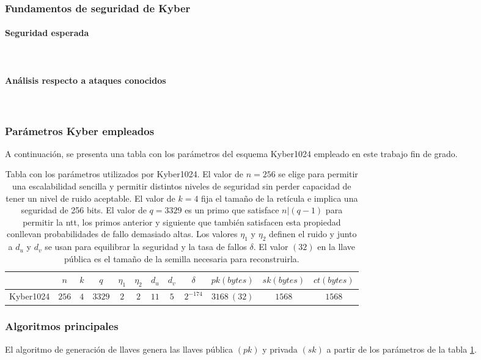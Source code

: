 \subsubsection{Fundamentos de seguridad de Kyber}
\paragraph{Seguridad esperada}
\mbox{}\\
\paragraph{Análisis respecto a ataques conocidos}
\mbox{}\\
\subsubsection{Parámetros Kyber empleados}
A continuación, se presenta una tabla con los parámetros del esquema Kyber1024 empleado en este trabajo fin de grado.
\begin{table}[h]
	\centering
	\renewcommand{\arraystretch}{1.2}
	\begin{tabular}{lccccccccccc}
		\hline
		&\(n\)&\(k\)&\(q\)&\(\eta_1\)&\(\eta_2\)&\(d_u\)&\(d_v\)&\(\delta\)&\(pk (bytes)\)&\(sk (bytes)\)&\(ct (bytes)\)\\
		\hline
		Kyber1024&\(256\)&\(4\)&\(3329\)&\(2\)&\(2\)&\(11\)&\(5\)&\(2^{-174}\)&\(3168 \ (32)\)&\(1568\)&\(1568\)\\
		\hline
	\end{tabular}
	\caption{Tabla con los parámetros utilizados por Kyber1024. El valor de \(n=256\) se elige para permitir una escalabilidad sencilla y permitir distintos niveles de seguridad sin perder capacidad de tener un nivel de ruido aceptable. El valor de \(k=4\) fija el tamaño de la retícula e implica una seguridad de 256 bits. El valor de \(q=3329\) es un primo que satisface \(n|(q-1)\) para permitir la \gls{ntt}, los primos anterior y siguiente que también satisfacen esta propiedad conllevan probabilidades de fallo demasiado altas. Los valores $\eta_1$ y $\eta_2$ definen el ruido y junto a \(d_u\) y \(d_v\) se usan para equilibrar la seguridad y la tasa de fallos $\delta$. El valor \((32)\) en la llave pública es el tamaño de la semilla necesaria para reconstruirla.}
	\label{tab:KyberParams}
\end{table}


\newpage

\subsubsection{Algoritmos principales \cite{kyber-spec-2021}}
\label{sub:kybAlg}
El algoritmo de generación de llaves genera las llaves pública \((pk)\) y privada \((sk)\) a partir de los parámetros de la tabla \ref{tab:KyberParams}.

